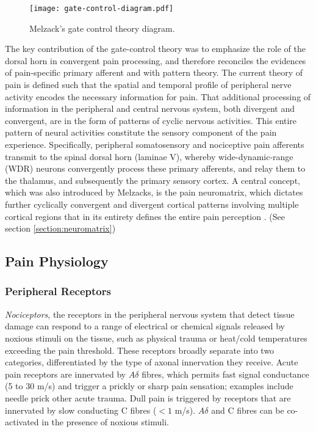  \begin{figure}[ht]
 \texttt{[image: gate-control-diagram.pdf]}
 \centering
 \caption{Melzack's gate control theory diagram.}
 \label{fig:gate-theory} 
 \end{figure}
 
The key contribution of the gate-control theory was to emphasize the role of the dorsal horn in convergent pain processing, and therefore reconciles the evidences of pain-specific primary afferent and with pattern theory. The current theory of pain is defined such that the spatial and temporal profile of peripheral nerve activity encodes the necessary information for pain. That additional processing of information in the peripheral and central nervous system, both divergent and convergent, are in the form of patterns of cyclic nervous activities. This entire pattern of neural activities constitute the sensory component of the pain experience. Specifically, peripheral somatosensory and nociceptive pain afferents transmit to the spinal dorsal horn (laminae V), whereby wide-dynamic-range (WDR) neurons convergently process these primary afferents, and relay them to the thalamus, and subsequently the primary sensory cortex. A central concept, which was also introduced by Melzacks, is the pain neuromatrix, which dictates further cyclically convergent and divergent cortical patterns involving multiple cortical regions that in its entirety defines the entire pain perception \cite{Melzack1999}. (See section \ref{section:neuromatrix})


\subsection{Pain Physiology}

\subsubsection{Peripheral Receptors}

\textit{Nociceptors}, the receptors in the peripheral nervous system that detect tissue damage can respond to a range of electrical or chemical signals released by noxious stimuli on the tissue, such as physical trauma or heat/cold temperatures exceeding the pain threshold. These receptors broadly separate into two categories, differentiated by the type of axonal innervation they receive. Acute pain receptors are innervated by $A\delta$ fibres, which permits fast signal conductance (5 to 30 m/s) and trigger a prickly or sharp pain sensation; examples include needle prick other acute trauma. Dull pain is triggered by receptors that are innervated by slow conducting C fibres ($<1$ m/s). $A\delta$ and C fibres can be co-activated in the presence of noxious stimuli. 

